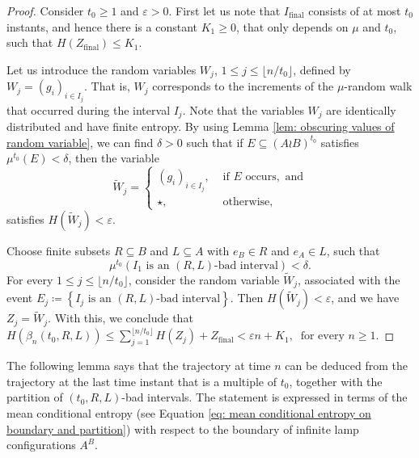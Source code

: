 \documentclass[reqno,oneside,11pt]{amsart}
\theoremstyle{plain}
\theoremstyle{definition}
\begin{document}
\begin{proof}
	Consider $t_0\ge 1$ and $\varepsilon>0$. First let us note that $I_{\mathrm{final}}$ consists of at most $t_0$ instants, and hence there is a constant $K_1\ge 0$, that only depends on $\mu$ and $t_0$, such that $H(Z_{\mathrm{final}})\le K_1$.
	
	Let us introduce the random variables $W_{j}$, $1\le j \le \lfloor n/t_0 \rfloor$, defined by $W_{j}=(g_i)_{i\in I_j}$. That is, $W_j$ corresponds to the increments of the $\mu$-random walk that occurred during the interval $I_j$. Note that the variables $W_{j}$ are identically distributed and have finite entropy. By using Lemma \ref{lem: obscuring values of random variable}, we can find $\delta>0$ such that if $E\subseteq (A\wr B)^{t_0}$ satisfies $\mu^{t_0}(E)<\delta$, then the variable
	\begin{equation*}
		\widetilde{W}_{j}=\begin{cases}
			(g_i)_{i\in I_j}, &\text{ if }E\text{ occurs}, \text{ and}\\
			\star, &\text{ otherwise,}
		\end{cases}
	\end{equation*}
	satisfies $H(\widetilde{W}_{j})<\varepsilon$.
	
	Choose finite subsets $R\subseteq B$ and $L\subseteq A$ with $e_B\in R$ and $e_A\in L$, such that
	\begin{equation*}
		\mu^{t_0}(I_1 \text{ is an }(R,L)\text{-bad interval})<\delta.
	\end{equation*}
	For every $1\le j \le \lfloor n/t_0 \rfloor$, consider the random variable $\widetilde{W}_{j}$, associated with the event $E_j\coloneqq \left \{I_j \text{ is an }(R,L)\text{-bad interval} \right\}$. Then $H(\widetilde{W}_{j})<\varepsilon$, and we have $Z_j=\widetilde{W}_{j}$. With this, we conclude that $
		H(\beta_n(t_0,R,L))\le \sum_{j=1}^{ \lfloor n/t_0 \rfloor}H(Z_j)+Z_{\mathrm{final}}<\varepsilon n +K_1,	\ \text{ for every }n\ge 1.$
	
\end{proof}


The following lemma says that the trajectory at time $n$ can be deduced from the trajectory at the last time instant that is a multiple of $t_0$, together with the partition of $(t_0,R,L)$-bad intervals. The statement is expressed in terms of the mean conditional entropy (see Equation \eqref{eq: mean conditional entropy on boundary and partition}) with respect to the boundary of infinite lamp configurations $A^B$.
\end{document}
